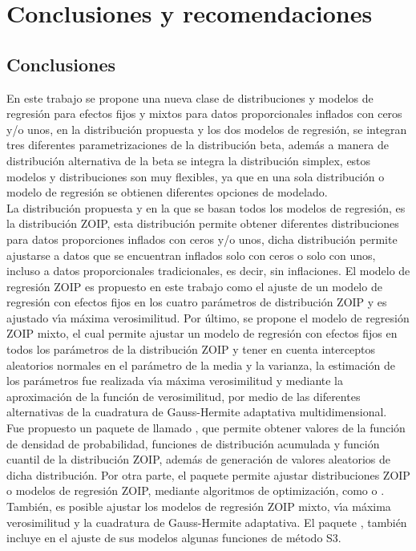 \chapter{Conclusiones y recomendaciones}
\section{Conclusiones}

En este trabajo se propone una nueva clase de distribuciones y modelos de regresi\'{o}n para efectos fijos y mixtos para datos proporcionales inflados con ceros y/o unos, en la distribuci\'{o}n propuesta y los dos modelos de regresi\'{o}n, se integran tres diferentes parametrizaciones de la distribuci\'{o}n beta, adem\'{a}s a manera de distribuci\'{o}n alternativa de la beta se integra la distribuci\'{o}n simplex, estos modelos y distribuciones son muy flexibles, ya que en una sola distribuci\'{o}n o modelo de regresi\'{o}n se obtienen diferentes opciones de modelado.\\

La distribuci\'{o}n propuesta y en la que se basan todos los modelos de regresi\'{o}n, es la distribuci\'{o}n ZOIP, esta distribuci\'{o}n permite obtener diferentes distribuciones para datos proporciones inflados con ceros y/o unos, dicha distribuci\'{o}n permite ajustarse a datos que se encuentran inflados solo con ceros o solo con unos, incluso a datos proporcionales tradicionales, es decir, sin inflaciones. El modelo de regresi\'{o}n ZOIP es propuesto en este trabajo como el ajuste de un modelo de regresi\'{o}n con efectos fijos en los cuatro par\'{a}metros de distribuci\'{o}n ZOIP y es ajustado v\'{\i}a m\'{a}xima verosimilitud. Por \'{u}ltimo, se propone el modelo de regresi\'{o}n ZOIP mixto, el cual permite ajustar un modelo de regresi\'{o}n con efectos fijos en todos los par\'{a}metros de la distribuci\'{o}n ZOIP y tener en cuenta interceptos aleatorios normales en el par\'{a}metro de la media y la varianza, la estimaci\'{o}n de los par\'{a}metros fue realizada v\'{\i}a m\'{a}xima verosimilitud y mediante la aproximaci\'{o}n de la funci\'{o}n de verosimilitud, por medio de las diferentes alternativas de la cuadratura de Gauss-Hermite adaptativa multidimensional.\\
 
Fue propuesto un paquete de  llamado , que permite obtener valores de la funci\'{o}n de densidad de probabilidad, funciones de distribuci\'{o}n acumulada y funci\'{o}n cuantil de la distribuci\'{o}n ZOIP, adem\'{a}s de generaci\'{o}n de valores aleatorios de dicha distribuci\'{o}n. Por otra parte, el paquete permite ajustar distribuciones ZOIP o modelos de regresi\'{o}n ZOIP, mediante algoritmos de optimizaci\'{o}n, como  o . Tambi\'{e}n, es posible ajustar los modelos de regresi\'{o}n ZOIP mixto, v\'{\i}a m\'{a}xima verosimilitud y la cuadratura de Gauss-Hermite adaptativa. El paquete , tambi\'{e}n incluye en el ajuste de sus modelos algunas funciones de m\'{e}todo S3.\\

